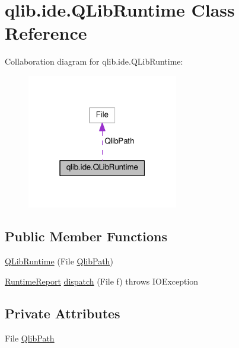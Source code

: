 \hypertarget{classqlib_1_1ide_1_1QLibRuntime}{}\section{qlib.\+ide.\+Q\+Lib\+Runtime Class Reference}
\label{classqlib_1_1ide_1_1QLibRuntime}


Collaboration diagram for qlib.\+ide.\+Q\+Lib\+Runtime\+:\nopagebreak
\begin{figure}[H]
\begin{center}
\leavevmode
\includegraphics[width=187pt]{classqlib_1_1ide_1_1QLibRuntime__coll__graph}
\end{center}
\end{figure}
\subsection*{Public Member Functions}
\begin{DoxyCompactItemize}
\item 
\hyperlink{classqlib_1_1ide_1_1QLibRuntime_a8525f2178485c12a94d9caf9fb09d47c}{Q\+Lib\+Runtime} (File \hyperlink{classqlib_1_1ide_1_1QLibRuntime_a4f27be4c59b8b5005822acc9e36e1279}{Qlib\+Path})
\item 
\hyperlink{classqlib_1_1ide_1_1RuntimeReport}{Runtime\+Report} \hyperlink{classqlib_1_1ide_1_1QLibRuntime_a6e2d353e7b2bcd11ac50ee0e6465f044}{dispatch} (File f)  throws I\+O\+Exception
\end{DoxyCompactItemize}
\subsection*{Private Attributes}
\begin{DoxyCompactItemize}
\item 
File \hyperlink{classqlib_1_1ide_1_1QLibRuntime_a4f27be4c59b8b5005822acc9e36e1279}{Qlib\+Path}
\end{DoxyCompactItemize}


